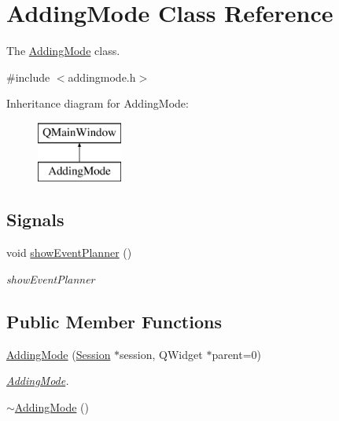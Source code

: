 \hypertarget{class_adding_mode}{}\section{Adding\+Mode Class Reference}
\label{class_adding_mode}


The \hyperlink{class_adding_mode}{Adding\+Mode} class.  




{\ttfamily \#include $<$addingmode.\+h$>$}

Inheritance diagram for Adding\+Mode\+:\begin{figure}[H]
\begin{center}
\leavevmode
\includegraphics[height=2.000000cm]{class_adding_mode}
\end{center}
\end{figure}
\subsection*{Signals}
\begin{DoxyCompactItemize}
\item 
void \hyperlink{class_adding_mode_ac9a9d671ccfc803f9844cde060a12ca5}{show\+Event\+Planner} ()
\begin{DoxyCompactList}\small\item\em show\+Event\+Planner \end{DoxyCompactList}\end{DoxyCompactItemize}
\subsection*{Public Member Functions}
\begin{DoxyCompactItemize}
\item 
\hyperlink{class_adding_mode_aa8830870d671f8d806bedd0ecf03d065}{Adding\+Mode} (\hyperlink{class_session}{Session} $\ast$session, Q\+Widget $\ast$parent=0)
\begin{DoxyCompactList}\small\item\em \hyperlink{class_adding_mode}{Adding\+Mode}. \end{DoxyCompactList}\item 
\hyperlink{class_adding_mode_a7006861b4a358f4cdc704bcfe15e5a7a}{$\sim$\+Adding\+Mode} ()
\end{DoxyCompactItemize}


